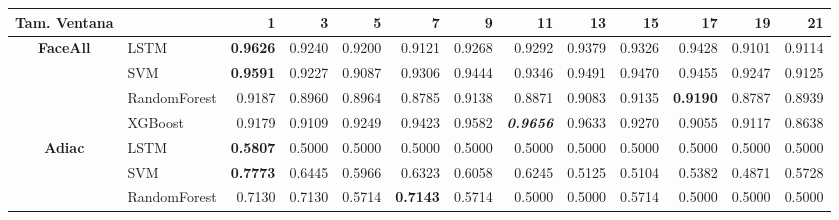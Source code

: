 \begin{table}[H]
	\centering
	\begin{adjustbox}{max width=12cm}
		\begin{tabular}{|c|l|r|r|r|r|r|r|r|r|r|r|r|}
			\hline
			\textbf{Tam. Ventana} &              & 1                        & 3               & 5                        & 7                        & 9               & 11                       & 13     & 15     & 17                       & 19              & 21              \\
			\hline
			\textbf{FaceAll}      & LSTM         & \textbf{0.9626}          & 0.9240          & 0.9200                   & 0.9121                   & 0.9268          & 0.9292                   & 0.9379 & 0.9326 & 0.9428                   & 0.9101          & 0.9114          \\
			                      & SVM          & \textbf{0.9591}          & 0.9227          & 0.9087                   & 0.9306                   & 0.9444          & 0.9346                   & 0.9491 & 0.9470 & 0.9455                   & 0.9247          & 0.9125          \\
			                      & RandomForest & 0.9187                   & 0.8960          & 0.8964                   & 0.8785                   & 0.9138          & 0.8871                   & 0.9083 & 0.9135 & \textbf{0.9190}          & 0.8787          & 0.8939          \\
			                      & XGBoost      & 0.9179                   & 0.9109          & 0.9249                   & 0.9423                   & 0.9582          & \textit{\textbf{0.9656}} & 0.9633 & 0.9270 & 0.9055                   & 0.9117          & 0.8638          \\
			\hline
			\textbf{Adiac}        & LSTM         & \textbf{0.5807}          & 0.5000          & 0.5000                   & 0.5000                   & 0.5000          & 0.5000                   & 0.5000 & 0.5000 & 0.5000                   & 0.5000          & 0.5000          \\
			                      & SVM          & \textbf{0.7773}          & 0.6445          & 0.5966                   & 0.6323                   & 0.6058          & 0.6245                   & 0.5125 & 0.5104 & 0.5382                   & 0.4871          & 0.5728          \\
			                      & RandomForest & 0.7130                   & 0.7130          & 0.5714                   & \textbf{0.7143}          & 0.5714          & 0.5000                   & 0.5000 & 0.5714 & 0.5000                   & 0.5000          & 0.5000          \\

\end{tabular}
\end{adjustbox}
\end{table}
